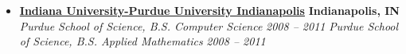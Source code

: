%
\begin{itemize}
    \parskip=0.1em

    \item
    \headerrow
        {\textbf{\href{https://www.iupui.edu/}{Indiana University-Purdue University Indianapolis}}}
        {\textbf{Indianapolis, IN}}
    \\
    \headerrow
        {\emph{Purdue School of Science, B.S. Computer Science}}
        {\emph{2008 -- 2011}}
    \headerrow
        {\emph{Purdue School of Science, B.S. Applied Mathematics}}
        {\emph{2008 -- 2011}}
\end{itemize}
